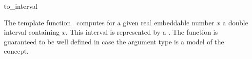 \begin{ccRefFunction}{to_interval}

\ccDefinition

The template function \ccRefName\ computes for a given real embeddable 
number $x$ a double interval containing $x$. 
This interval is represented by a . 
The function is guaranteed to be well defined in case the argument type 
is a model of the  concept. 


{}

\ccSeeAlso

\\
\\

\end{ccRefFunction}
